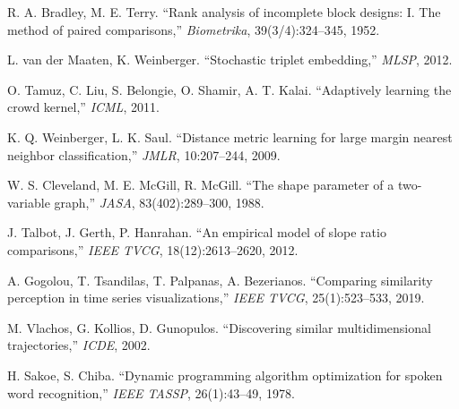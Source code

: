 \documentclass[11pt]{article}
\begin{document}
{\begin{enumerate}[leftmargin=*,itemsep=0pt,parsep=0pt,label={[\arabic*]}]
\item R. A. Bradley, M. E. Terry. ``Rank analysis of incomplete block designs: I. The method
of paired comparisons,'' \emph{Biometrika}, 39(3/4):324--345, 1952.
\item L. van der Maaten, K. Weinberger. ``Stochastic triplet embedding,'' \emph{MLSP}, 2012.
\item O. Tamuz, C. Liu, S. Belongie, O. Shamir, A. T. Kalai. ``Adaptively learning the crowd
kernel,'' \emph{ICML}, 2011.
\item K. Q. Weinberger, L. K. Saul. ``Distance metric learning for large margin nearest
neighbor classification,'' \emph{JMLR}, 10:207--244, 2009.
\item W. S. Cleveland, M. E. McGill, R. McGill. ``The shape parameter of a two-variable
graph,'' \emph{JASA}, 83(402):289--300, 1988.
\item J. Talbot, J. Gerth, P. Hanrahan. ``An empirical model of slope ratio comparisons,''
\emph{IEEE TVCG}, 18(12):2613--2620, 2012.
\item A. Gogolou, T. Tsandilas, T. Palpanas, A. Bezerianos. ``Comparing similarity perception
in time series visualizations,'' \emph{IEEE TVCG}, 25(1):523--533, 2019.
\item M. Vlachos, G. Kollios, D. Gunopulos. ``Discovering similar multidimensional
trajectories,'' \emph{ICDE}, 2002.
\item H. Sakoe, S. Chiba. ``Dynamic programming algorithm optimization for spoken word
recognition,'' \emph{IEEE TASSP}, 26(1):43--49, 1978.
\end{enumerate}
}
\end{document}
